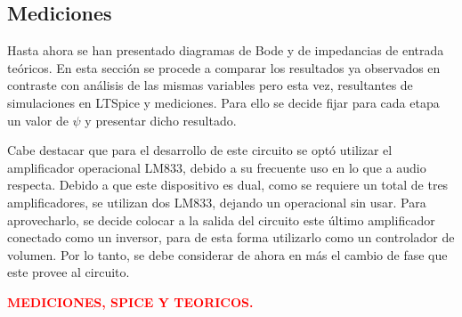 \documentclass[a4paper]{article}
\begin{document}
\subsection{Mediciones}

Hasta ahora se han presentado diagramas de Bode y de impedancias de entrada teóricos. En esta sección se procede a comparar los resultados ya observados en contraste con análisis de las mismas variables pero esta vez, resultantes de simulaciones en LTSpice y mediciones. Para ello se decide fijar para cada etapa un valor de $\psi$ y presentar dicho resultado.

Cabe destacar que para el desarrollo de este circuito se optó utilizar el amplificador operacional LM833, debido a su frecuente uso en lo que a audio respecta. Debido a que este dispositivo es dual, como se requiere un total de tres amplificadores, se utilizan dos LM833, dejando un operacional sin usar. Para aprovecharlo, se decide colocar a la salida del circuito este último amplificador conectado como un inversor, para de esta forma utilizarlo como un controlador de volumen. Por lo tanto, se debe considerar de ahora en más el cambio de fase que este provee al circuito.   

\begin{center}
	\textcolor{red}{\textbf{MEDICIONES, SPICE Y TEORICOS.}}
\end{center} 
\end{document}
